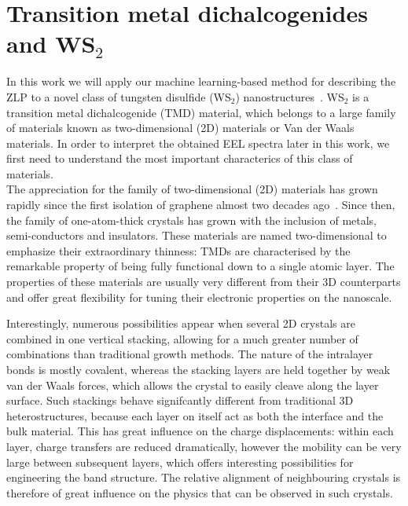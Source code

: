 \section{Transition metal dichalcogenides and WS$_2$}
\label{sec:tmd}

In this work we will apply our machine learning-based method
for describing the ZLP to a novel class of tungsten disulfide (WS$_2$) nanostructures~\cite{SabryaWS2}.
%
WS$_2$ is a transition metal dichalcogenide (TMD) material, which 
belongs to a large family of materials known as two-dimensional (2D) materials or Van der Waals materials.
%
In order to interpret  the obtained EEL spectra later in this work, we first need to 
understand the most important characterics of this class of materials.\\

The appreciation for the family of two-dimensional (2D) materials has grown rapidly since the 
first isolation of graphene almost two decades ago~\cite{Novoselov:2004}.
%
Since then, the family of one-atom-thick crystals has grown with the inclusion of metals, semi-conductors
and insulators. 
%
These materials are named two-dimensional to emphasize their extraordinary thinness: 
TMDs are characterised by the remarkable property of being fully 
functional down to a single atomic layer.
%
The properties of these materials are usually very different from their 3D counterparts
and offer great flexibility for tuning their electronic properties on the nanoscale.

Interestingly, numerous possibilities appear when several 2D crystals are combined in one vertical stacking,
allowing for a much greater number of combinations than traditional growth methods.
%
The nature of the intralayer bonds is mostly covalent, whereas the stacking layers 
are held together by weak van der Waals forces, which allows the crystal to easily cleave 
along the layer surface.
%
Such stackings behave signifcantly different from traditional 3D heterostructures, because each layer 
on itself act as both the interface and the bulk material. 
%
This has great influence on the charge displacements: within each layer, charge transfers are reduced
dramatically, however the mobility can be very large between subsequent layers, which offers
interesting possibilities for engineering the band structure.
%
The relative alignment of neighbouring crystals is therefore of great influence on the physics that can be
observed in such crystals.\\


